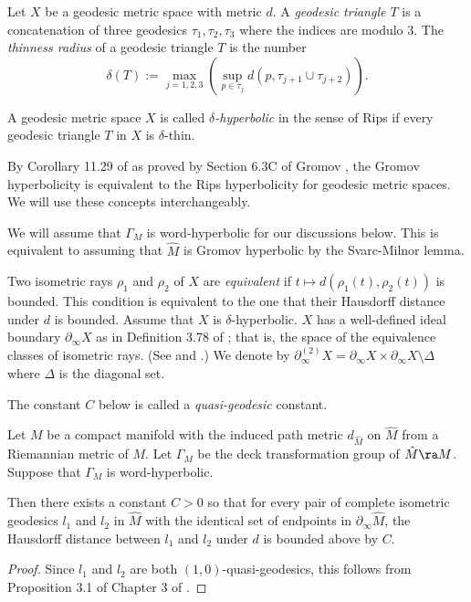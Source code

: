 Let $X$ be a geodesic metric space with metric $d$. 
A {\em geodesic triangle $T$} is a concatenation of three geodesics $\tau_1, \tau_2, \tau_3$ where the indices are modulo $3$. 
The {\em thinness radius} of a geodesic triangle $T$ is the number 
\[ \delta(T) := \max_{j=1,2,3} \left( \sup_{p \in \tau_j} d(p, \tau_{j+1}\cup \tau_{j+2}) \right). \]


A geodesic metric space $X$ is called {\em $\delta$-hyperbolic} in the sense of Rips if 
every geodesic triangle $T$ in $X$ is $\delta$-thin. 

By Corollary 11.29 of \cite{DK2018} as proved by Section 6.3C of 
Gromov \cite{Gromov87}, 
the Gromov hyperbolicity is equivalent to the Rips hyperbolicity
for geodesic metric spaces.
We will use these concepts interchangeably. 


We will assume that $\Gamma_M$ is word-hyperbolic for our discussions below. 
This is equivalent to assuming that
$\hat M$ is Gromov hyperbolic by the Svarc-Milnor lemma.



Two isometric rays $\rho_1$ and $\rho_2$ of $X$ are {\em equivalent} if 
$t\mapsto d(\rho_1(t), \rho_2(t))$ is bounded.  
This condition is equivalent to the one that their Hausdorff distance under $d$ is bounded. 
Assume that $X$ is $\delta$-hyperbolic. $X$ has a well-defined ideal boundary 
$\partial_\infty X$ as in Definition 3.78 of \cite{DK2018}; 
that is, the space of the equivalence classes of isometric rays. 
 (See \cite{CDP90} and \cite{GdH90}.) 
 We denote by $\partial^{(2)}_\infty X = \partial_\infty X \times \partial_\infty X \setminus \Delta$ 
 where $\Delta$ is the diagonal set. 

The constant $C$ below is called a {\em quasi-geodesic} constant. 
 \begin{lemma} \label{lem:twogeo} 
	Let $M$ be a compact manifold with 
	the induced path metric $d_{\hat M}$ on $\hat M$
	from a Riemannian metric of $M$.
	Let $\Gamma_M$ be the deck transformation group of $\hat M \ra M$.  
	Suppose that $\Gamma_M$ is word-hyperbolic. 

Then there exists a constant $C >0$ so that
for every pair of
	complete isometric geodesics $l_1$ and $l_2$ in $\hat M$
with the identical set of endpoints in $\partial_\infty \hat M$, the Hausdorff distance between 
$l_1$ and $l_2$ under $d$ is bounded above by $C$. 
\end{lemma} 
\begin{proof}
	Since $l_1$ and $l_2$ are both $(1, 0)$-quasi-geodesics, 
	this follows from Proposition 3.1 of Chapter 3 of \cite{CDP90}. 
\end{proof} 


